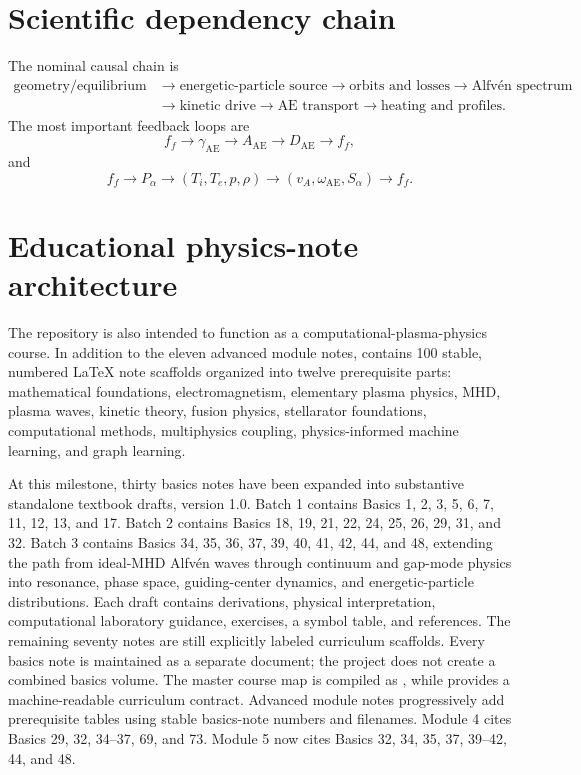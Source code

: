 \documentclass[11pt]{article}
\begin{document}
\section{Scientific dependency chain}
The nominal causal chain is
\begin{equation}
\begin{aligned}
\text{geometry/equilibrium}
&\rightarrow \text{energetic-particle source}
\rightarrow \text{orbits and losses}
\rightarrow \text{Alfv\'en spectrum}\\
&\rightarrow \text{kinetic drive}
\rightarrow \text{AE transport}
\rightarrow \text{heating and profiles}.
\end{aligned}
\end{equation}
The most important feedback loops are
\begin{equation}
f_f\rightarrow\gamma_{\mathrm{AE}}\rightarrow A_{\mathrm{AE}}\rightarrow D_{\mathrm{AE}}\rightarrow f_f,
\end{equation}
and
\begin{equation}
f_f\rightarrow P_\alpha\rightarrow(T_i,T_e,p,\rho)\rightarrow(v_A,\omega_{\mathrm{AE}},S_\alpha)\rightarrow f_f.
\end{equation}

\section{Educational physics-note architecture}
The repository is also intended to function as a computational-plasma-physics course. In addition to the eleven advanced module notes,  contains 100 stable, numbered LaTeX note scaffolds organized into twelve prerequisite parts: mathematical foundations, electromagnetism, elementary plasma physics, MHD, plasma waves, kinetic theory, fusion physics, stellarator foundations, computational methods, multiphysics coupling, physics-informed machine learning, and graph learning.

At this milestone, thirty basics notes have been expanded into substantive standalone textbook drafts, version 1.0. Batch 1 contains Basics 1, 2, 3, 5, 6, 7, 11, 12, 13, and 17. Batch 2 contains Basics 18, 19, 21, 22, 24, 25, 26, 29, 31, and 32. Batch 3 contains Basics 34, 35, 36, 37, 39, 40, 41, 42, 44, and 48, extending the path from ideal-MHD Alfv\'en waves through continuum and gap-mode physics into resonance, phase space, guiding-center dynamics, and energetic-particle distributions. Each draft contains derivations, physical interpretation, computational laboratory guidance, exercises, a symbol table, and references. The remaining seventy notes are still explicitly labeled curriculum scaffolds. Every basics note is maintained as a separate document; the project does not create a combined basics volume. The master course map is compiled as , while  provides a machine-readable curriculum contract. Advanced module notes progressively add prerequisite tables using stable basics-note numbers and filenames. Module 4 cites Basics 29, 32, 34--37, 69, and 73. Module 5 now cites Basics 32, 34, 35, 37, 39--42, 44, and 48.
\end{document}
